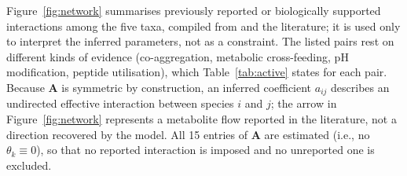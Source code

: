 \documentclass[pdflatex,sn-mathphys-ay,lineno]{sn-jnl}%
\begin{document}
Figure~\ref{fig:network} summarises previously reported or biologically supported interactions among the five taxa, compiled from \citet{heine2025influence} and the literature; it is used only to interpret the inferred parameters, not as a constraint.
The listed pairs rest on different kinds of evidence (co-aggregation, metabolic cross-feeding, pH modification, peptide utilisation), which Table~\ref{tab:active} states for each pair.
Because $\mathbf{A}$ is symmetric by construction, an inferred coefficient $a_{ij}$ describes an undirected effective interaction between species $i$ and $j$; the arrow in Figure~\ref{fig:network} represents a metabolite flow reported in the literature, not a direction recovered by the model.
All 15 entries of $\mathbf{A}$ are estimated (i.e., no $\theta_k\equiv0$), so that no reported interaction is imposed and no unreported one is excluded.
\end{document}
